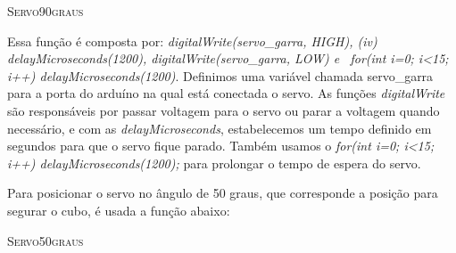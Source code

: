  \begin{algorithm}[H]
   \SetAlgoLined
   \label{alg1}
   \caption{\textsc{Servo90graus}}
 \end{algorithm}
 
 
 Essa função é composta por:  \textit{digitalWrite(servo\_garra, HIGH), (iv) delayMicroseconds(1200),  digitalWrite(servo\_garra, LOW) e \ for(int i=0; i<15; i++) delayMicroseconds(1200)}. Definimos uma variável chamada servo\_garra para a porta do arduíno na qual está conectada o servo. As funções \textit{digitalWrite} são responsáveis por passar voltagem para o servo ou parar a voltagem quando necessário, e com as \textit{delayMicroseconds}, estabelecemos um tempo definido em segundos para que o servo fique parado. Também usamos o \textit{for(int i=0; i<15; i++) delayMicroseconds(1200);} para prolongar o tempo de espera do servo.
 
Para posicionar o servo no ângulo de  50 graus, que corresponde a posição para segurar o cubo, é usada a função abaixo:
\begin{algorithm}[H]
   \SetAlgoLined
   \label{alg1}
   \caption{\textsc{Servo50graus}}
 \end{algorithm}



